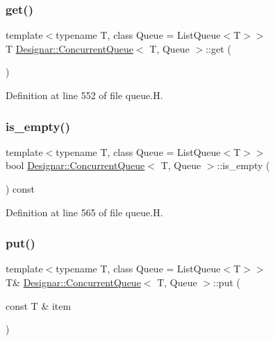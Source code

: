 \subsubsection{\texorpdfstring{get()}{get()}}
{\footnotesize\ttfamily template$<$typename T, class Queue = List\+Queue$<$\+T$>$$>$ \\
T \hyperlink{class_designar_1_1_concurrent_queue}{Designar\+::\+Concurrent\+Queue}$<$ T, Queue $>$\+::get (\begin{DoxyParamCaption}{ }\end{DoxyParamCaption})\hspace{0.3cm}{\ttfamily [inline]}}



Definition at line 552 of file queue.\+H.

\mbox{\label{class_designar_1_1_concurrent_queue_a7e73feaae8bc8aae37145a2484f28ea2}} 
\subsubsection{\texorpdfstring{is\+\_\+empty()}{is\_empty()}}
{\footnotesize\ttfamily template$<$typename T, class Queue = List\+Queue$<$\+T$>$$>$ \\
bool \hyperlink{class_designar_1_1_concurrent_queue}{Designar\+::\+Concurrent\+Queue}$<$ T, Queue $>$\+::is\+\_\+empty (\begin{DoxyParamCaption}{ }\end{DoxyParamCaption}) const\hspace{0.3cm}{\ttfamily [inline]}}



Definition at line 565 of file queue.\+H.

\mbox{\label{class_designar_1_1_concurrent_queue_a0ed3cfb2755c04be0f55f485b71637b9}} 
\subsubsection{\texorpdfstring{put()}{put()}\hspace{0.1cm}{\footnotesize\ttfamily [1/2]}}
{\footnotesize\ttfamily template$<$typename T, class Queue = List\+Queue$<$\+T$>$$>$ \\
T\& \hyperlink{class_designar_1_1_concurrent_queue}{Designar\+::\+Concurrent\+Queue}$<$ T, Queue $>$\+::put (\begin{DoxyParamCaption}\item[{const T \&}]{item }\end{DoxyParamCaption})\hspace{0.3cm}{\ttfamily [inline]}}



